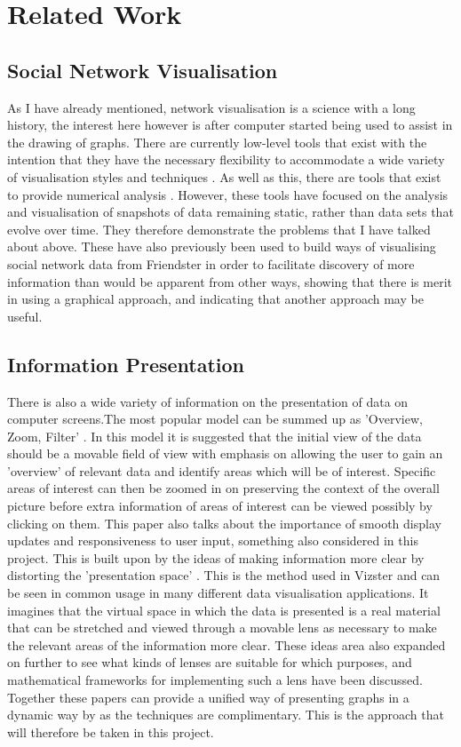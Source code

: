 \documentclass[12pt,a4paper]{article}
\begin{document}
\section{Related Work}

\subsection{Social Network Visualisation}
As I have already mentioned, network visualisation is a science with a long history, the interest here however is after computer started being used to assist in the drawing of graphs. There are currently low-level tools that exist with the intention that they have the necessary flexibility to accommodate a wide variety of visualisation styles and techniques \cite{heer2005prefuse}. As well as this, there are tools that exist to provide numerical analysis \cite{borgatti2002ucinet}. However, these tools have focused on the analysis and visualisation of snapshots of data remaining static, rather than data sets that evolve over time. They therefore demonstrate the problems that I have talked about above. These have also previously been used to build ways of visualising social network data from Friendster \cite{heer2005vizster} in order to facilitate discovery of more information than would be apparent from other ways, showing that there is merit in using a graphical approach, and indicating that another approach may be useful.

\subsection{Information Presentation}
There is also a wide variety of information on the presentation of data on computer screens.The most popular model can be summed up as 'Overview, Zoom, Filter' \cite{shneiderman1996eyes}. In this model it is suggested that the initial view of the data should be a movable field of view with emphasis on allowing the user to gain an 'overview' of relevant data and identify areas which will be of interest. Specific areas of interest can then be zoomed in on preserving the context of the overall picture before extra information of areas of interest can be viewed possibly by clicking on them. This paper also talks about the importance of smooth display updates and responsiveness to user input, something also considered in this project. This is built upon by the ideas of making information more clear by distorting the 'presentation space' \cite{carpendale2001framework}. This is the method used in Vizster and can be seen in common usage in many different data visualisation applications. It imagines that the virtual space in which the data is presented is a real material that can be stretched and viewed through a movable lens as necessary to make the relevant areas of the information more clear. These ideas area also expanded on further to see what kinds of lenses are suitable for which purposes, and mathematical frameworks for implementing such a lens \cite{leung1994review} have been discussed. Together these papers can provide a unified way of presenting graphs in a dynamic way by as the techniques are complimentary. This is the approach that will therefore be taken in this project.
\end{document}
